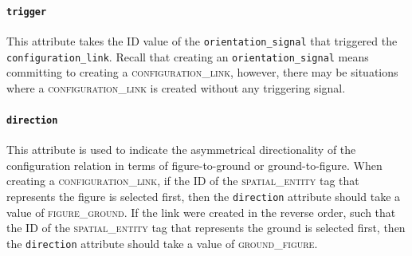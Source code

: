 \documentclass[11pt]{article}
\newcommand{\entity}[2]{[\textbf{\color{darkblue}#1}$_{se#2}$]}
\begin{document}


\paragraph{\texttt{trigger}} %
\label{par:trigger}
This attribute takes the ID value of the \texttt{orientation\_signal} that triggered the \texttt{configuration\_link}. Recall that creating an \texttt{orientation\_signal} means committing to creating a \textsc{configuration\_link}, however, there may be situations where a \textsc{configuration\_link} is created without any triggering signal.





\paragraph{\texttt{direction}} %
\label{par:direction}
This attribute is used to indicate the asymmetrical directionality of the configuration relation in terms of figure-to-ground or ground-to-figure. When creating a \textsc{configuration\_link}, if the ID of the \textsc{spatial\_entity} tag that represents the figure is selected first, then the \texttt{direction} attribute should take a value of \textsc{figure\_ground}. If the link were created in the reverse order, such that the ID of the \textsc{spatial\_entity} tag that represents the ground is selected first, then the \texttt{direction} attribute should take a value of \textsc{ground\_figure}.
\end{document}
